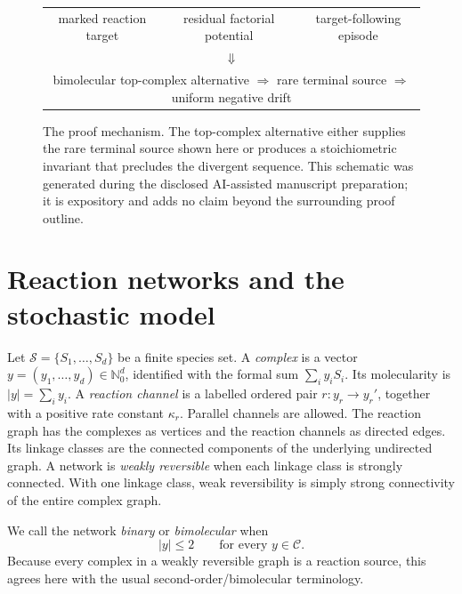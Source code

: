 \begin{figure}[t]
\centering
\small
\setlength{\tabcolsep}{0.35em}
\begin{tabular}{c@{\(\;\Longrightarrow\;\)}c@{\(\;\Longrightarrow\;\)}c}
marked reaction target & residual factorial potential & target-following episode\\[0.35em]
\multicolumn{3}{c}{\(\Downarrow\)}\\[-0.15em]
\multicolumn{3}{c}{bimolecular top-complex alternative
\(\Longrightarrow\) rare terminal source \(\Longrightarrow\) uniform negative drift}
\end{tabular}
\caption{The proof mechanism.  The top-complex alternative either supplies
the rare terminal source shown here or produces a stoichiometric invariant
that precludes the divergent sequence.  This schematic was generated during
the disclosed AI-assisted manuscript preparation; it is expository and adds
no claim beyond the surrounding proof outline.}
\label{fig:architecture}
\end{figure}

\section{Reaction networks and the stochastic model}\label{sec:model}

Let \(\mathcal S=\{S_1,\dots,S_d\}\) be a finite species set.  A
\emph{complex} is a vector \(y=(y_1,\dots,y_d)\in\mathbb N_0^d\), identified
with the formal sum \(\sum_i y_iS_i\).  Its molecularity is
\(|y|=\sum_i y_i\).  A \emph{reaction channel} is a labelled ordered pair
\(r:y_r\to y_r'\), together with a positive rate constant \(\kappa_r\).
Parallel channels are allowed.  The reaction graph has the complexes as
vertices and the reaction channels as directed edges.  Its linkage classes
are the connected components of the underlying undirected graph.  A network
is \emph{weakly reversible} when each linkage class is strongly connected.
With one linkage class, weak reversibility is simply strong connectivity of
the entire complex graph.

We call the network \emph{binary} or \emph{bimolecular} when
\begin{equation}\label{eq:binary}
  |y|\le2\qquad\text{for every }y\in\mathcal C.
\end{equation}
Because every complex in a weakly reversible graph is a reaction source, this
agrees here with the usual second-order/bimolecular terminology.

